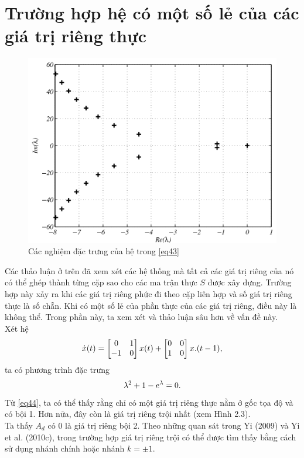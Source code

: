 \section{Trường hợp hệ có một số lẻ của các giá trị riêng thực}
\begin{figure}[h!]
	\centering
	\includegraphics[scale= 0.7]{"./Hinh/Hinh 3"}
	\caption[Các nghiệm đặc trưng của hệ trong  \eqref{43} ] {Các nghiệm đặc trưng của hệ trong  \eqref{eq43}}
	\label{fig:hinh-2}
\end{figure}
\noindent Các thảo luận ở trên đã xem xét các hệ thống mà tất cả các giá trị riêng của nó có thể ghép thành từng cặp sao cho các ma trận thực $S$ được xây dựng. 
Trường hợp này xảy ra khi các giá trị riêng phức đi theo cặp liên hợp và số giá trị riêng thực là số chẵn. Khi có một số lẻ của phần thực của các giá trị riêng, điều này là không thể. Trong phần này, ta xem xét và thảo luận sâu hơn về vấn đề này.\\
Xét hệ
\begin{equation}\label{eq43}
\dot{x}(t) = \begin{bmatrix} 0 & 1\\ - 1 & 0 \end{bmatrix}x(t) + \begin{bmatrix} 0 & 0 \\ 1 & 0 \end{bmatrix}x.(t - 1),
\end{equation}
ta có phương trình đặc trưng
\begin{equation}\label{eq44}
	\lambda^2 + 1 - e^{\lambda} = 0.
\end{equation}
Từ \eqref{eq44}, ta có thể thấy rằng chỉ có một giá trị riêng thực nằm ở gốc tọa độ và có bội 1. Hơn nữa, đây còn là giá trị riêng trội nhất (xem Hình 2.3).\\
Ta thấy $A_d$ có $0$ là giá trị riêng bội 2. Theo những quan sát trong Yi (2009) và Yi et al. (2010c), trong trường hợp giá trị riêng trội có thể được tìm thấy bằng cách sử dụng nhánh chính hoặc nhánh $k = \pm1$.\\
